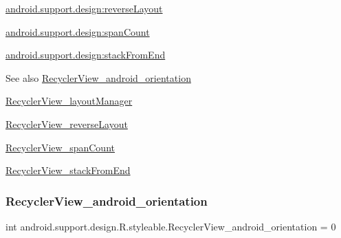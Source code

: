 {\ttfamily \hyperlink{classandroid_1_1support_1_1design_1_1R_1_1styleable_a29f1bf6c63be4868df7196198618fd81}{android.\+support.\+design\+:reverse\+Layout}}

{\ttfamily \hyperlink{classandroid_1_1support_1_1design_1_1R_1_1styleable_ae1dda25679ae35bb8c63ec940bb9a0fe}{android.\+support.\+design\+:span\+Count}}

{\ttfamily \hyperlink{classandroid_1_1support_1_1design_1_1R_1_1styleable_aa31f22249f518fec353aa52e96d2985d}{android.\+support.\+design\+:stack\+From\+End}}

\begin{DoxySeeAlso}{See also}
\hyperlink{classandroid_1_1support_1_1design_1_1R_1_1styleable_a70a6b71799c01329fe792b3d3d68b6d0}{Recycler\+View\+\_\+android\+\_\+orientation} 

\hyperlink{classandroid_1_1support_1_1design_1_1R_1_1styleable_ab43560bb439ac1da32a6c932be37da34}{Recycler\+View\+\_\+layout\+Manager} 

\hyperlink{classandroid_1_1support_1_1design_1_1R_1_1styleable_a29f1bf6c63be4868df7196198618fd81}{Recycler\+View\+\_\+reverse\+Layout} 

\hyperlink{classandroid_1_1support_1_1design_1_1R_1_1styleable_ae1dda25679ae35bb8c63ec940bb9a0fe}{Recycler\+View\+\_\+span\+Count} 

\hyperlink{classandroid_1_1support_1_1design_1_1R_1_1styleable_aa31f22249f518fec353aa52e96d2985d}{Recycler\+View\+\_\+stack\+From\+End} 
\end{DoxySeeAlso}
\mbox{\label{classandroid_1_1support_1_1design_1_1R_1_1styleable_a70a6b71799c01329fe792b3d3d68b6d0}} 
\subsubsection{\texorpdfstring{Recycler\+View\+\_\+android\+\_\+orientation}{RecyclerView\_android\_orientation}}
{\footnotesize\ttfamily int android.\+support.\+design.\+R.\+styleable.\+Recycler\+View\+\_\+android\+\_\+orientation = 0\hspace{0.3cm}{\ttfamily [static]}}

